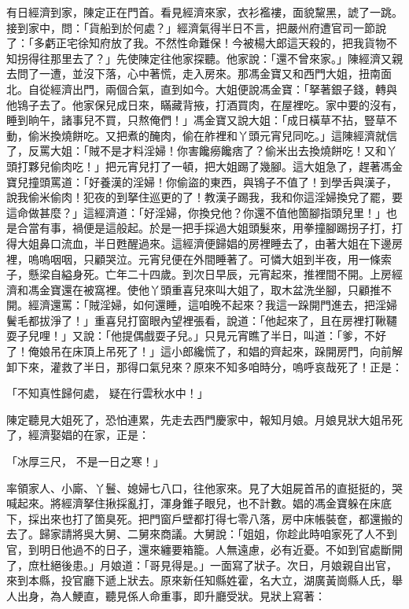有日經濟到家，陳定正在門首。看見經濟來家，衣衫襤褸，面貌黧黑，諕了一跳。接到家中，問：「貨船到於何處？」經濟氣得半日不言，把嚴州府遭官司一節說了：「多虧正宅徐知府放了我。不然性命難保！今被楊大郎這天殺的，把我貨物不知拐得往那里去了？」先使陳定往他家探聽。他家說：「還不曾來家。」陳經濟又親去問了一遭，並沒下落，心中著慌，走入房來。那馮金寶又和西門大姐，扭南面北。自從經濟出門，兩個合氣，直到如今。大姐便說馮金寶：「拏著銀子錢，轉與他鴇子去了。他家保兒成日來，瞞藏背掖，打酒買肉，在屋裡吃。家中要的沒有，睡到晌午，諸事兒不買，只熬俺們！」馮金寶又說大姐：「成日橫草不拈，豎草不動，偷米換燒餅吃。又把煮的醃肉，偷在舴裡和丫頭元宵兒同吃。」這陳經濟就信了，反罵大姐：「賊不是才料淫婦！你害饞癆饞痞了？偷米出去換燒餅吃！又和丫頭打夥兒偷肉吃！」把元宵兒打了一頓，把大姐踢了幾腳。這大姐急了，趕著馮金寶兒撞頭罵道：「好養漢的淫婦！你偷盜的東西，與鴇子不值了！到學舌與漢子，說我偷米偷肉！犯夜的到拏住巡更的了！教漢子踢我，我和你這淫婦換兌了罷，要這命做甚麼？」這經濟道：「好淫婦，你換兌他？你還不值他箇腳指頭兒里！」也是合當有事，禍便是這般起。於是一把手採過大姐頭髮來，用拳撞腳踢拐子打，打得大姐鼻口流血，半日甦醒過來。這經濟便歸娼的房裡睡去了，由著大姐在下邊房裡，嗚嗚咽咽，只顧哭泣。元宵兒便在外間睡著了。可憐大姐到半夜，用一條索子，懸梁自縊身死。亡年二十四歲。到次日早辰，元宵起來，推裡間不開。上房經濟和馮金寶還在被窩裡。使他丫頭重喜兒來叫大姐了，取木盆洗坐腳，只顧推不開。經濟還罵：「賊淫婦，如何還睡，這咱晚不起來？我這一跺開門進去，把淫婦鬢毛都拔淨了！」重喜兒打窗眼內望裡張看，說道：「他起來了，且在房裡打鞦韆耍子兒哩！」又說：「他提偶戲耍子兒。」只見元宵瞧了半日，叫道：「爹，不好了！俺娘吊在床頂上吊死了！」這小郎纔慌了，和娼的齊起來，跺開房門，向前解卸下來，灌救了半日，那得口氣兒來？原來不知多咱時分，嗚呼哀哉死了！正是：

「不知真性歸何處，  疑在行雲秋水中！」

陳定聽見大姐死了，恐怕連累，先走去西門慶家中，報知月娘。月娘見狀大姐吊死了，經濟娶娼的在家，正是：

「冰厚三尺，  不是一日之寒！」

率領家人、小廝、丫鬟、媳婦七八口，往他家來。見了大姐屍首吊的直挺挺的，哭喊起來。將經濟拏住揪採亂打，渾身錐子眼兒，也不計數。娼的馮金寶躲在床底下，採出來也打了箇臭死。把門窗戶壁都打得七零八落，房中床帳裝奩，都還搬的去了。歸家請將吳大舅、二舅來商議。大舅說：「姐姐，你趁此時咱家死了人不到官，到明日他過不的日子，還來纏要箱籠。人無遠慮，必有近憂。不如到官處斷開了，庶杜絕後患。」月娘道：「哥見得是。」一面寫了狀子。次日，月娘親自出官，來到本縣，投官廳下遞上狀去。原來新任知縣姓霍，名大立，湖廣黃崗縣人氏，舉人出身，為人鯁直，聽見係人命重事，即升廳受狀。見狀上寫著：

